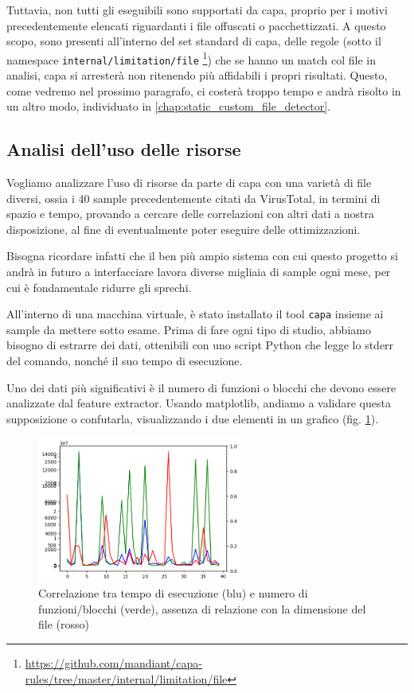 Tuttavia, non tutti gli eseguibili sono supportati da capa, proprio per i motivi precedentemente elencati riguardanti i file offuscati o pacchettizzati. A questo scopo, sono presenti all'interno del set standard di capa, delle regole
(sotto il namespace \texttt{internal/limitation/file} \footnote{\url{https://github.com/mandiant/capa-rules/tree/master/internal/limitation/file}})
che se hanno un match col file in analisi, capa si arresterà non ritenendo più affidabili i propri risultati.
Questo, come vedremo nel prossimo paragrafo, ci costerà troppo tempo e andrà risolto in un altro modo, individuato in \ref{chap:static_custom_file_detector}.

\subsection{Analisi dell'uso delle risorse}
Vogliamo analizzare l'uso di risorse da parte di capa con una varietà di file diversi, ossia i 40 sample precedentemente citati da VirusTotal, in termini di spazio e tempo, provando a cercare delle correlazioni con altri dati a nostra disposizione, al fine di eventualmente poter eseguire delle ottimizzazioni.

Bisogna ricordare infatti che il ben più ampio sistema con cui questo progetto si andrà in futuro a interfacciare lavora diverse migliaia di sample ogni mese, per cui è fondamentale ridurre gli sprechi.

All'interno di una macchina virtuale, è stato installato il tool \texttt{capa} insieme ai sample da mettere sotto esame.
Prima di fare ogni tipo di studio, abbiamo bisogno di estrarre dei dati, ottenibili con uno script Python che legge lo stderr del comando, nonché il suo tempo di esecuzione.

Uno dei dati più significativi è il numero di funzioni o blocchi che devono essere analizzate dal feature extractor.
Usando matplotlib, andiamo a validare questa supposizione o confutarla, visualizzando i due elementi in un grafico (fig. \ref{fig:capa_correlation_plot}).

\begin{figure}[!htb]
    \centering
    \includegraphics[width=0.6\textwidth]{assets/capa_correlation_plot.png}
    \caption{Correlazione tra tempo di esecuzione (blu) e numero di funzioni/blocchi (verde), assenza di relazione con la dimensione del file (rosso)}
    \label{fig:capa_correlation_plot}
\end{figure}


